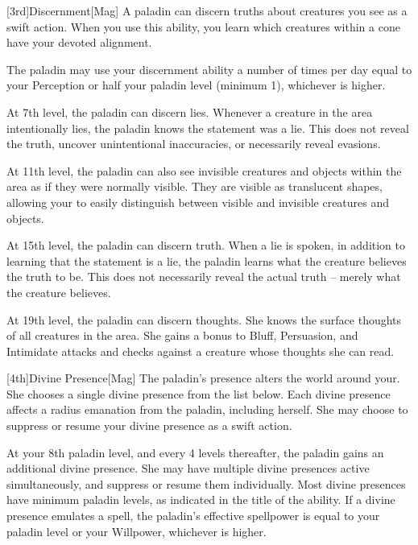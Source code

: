         [3rd]{Discernment}[Mag]
        A paladin can discern truths about creatures you see as a swift action.
        When you use this ability, you learn which creatures within a \arealarge cone have your devoted alignment.

        The paladin may use your discernment ability a number of times per day equal to your Perception or half your paladin level (minimum 1), whichever is higher.

        At 7th level, the paladin can discern lies.
        Whenever a creature in the area intentionally lies, the paladin knows the statement was a lie.
        This does not reveal the truth, uncover unintentional inaccuracies, or necessarily reveal evasions.

        At 11th level, the paladin can also see invisible creatures and objects within the area as if they were normally visible.
        They are visible as translucent shapes, allowing your to easily distinguish between visible and invisible creatures and objects.

        At 15th level, the paladin can discern truth.
        When a lie is spoken, in addition to learning that the statement is a lie, the paladin learns what the creature believes the truth to be.
        This does not necessarily reveal the actual truth -- merely what the creature believes.

        At 19th level, the paladin can discern thoughts.
        She knows the surface thoughts of all creatures in the area.
        She gains a  bonus to Bluff, Persuasion, and Intimidate attacks and checks against a creature whose thoughts she can read.

        [4th]{Divine Presence}[Mag]
        The paladin's presence alters the world around your.
        She chooses a single divine presence from the list below.
        Each divine presence affects a \areamed radius emanation from the paladin, including herself.
        She may choose to suppress or resume your divine presence as a swift action.

        At your 8th paladin level, and every 4 levels thereafter, the paladin gains an additional divine presence.
        She may have multiple divine presences active simultaneously, and suppress or resume them individually.
        Most divine presences have minimum paladin levels, as indicated in the title of the ability.
        If a divine presence emulates a spell, the paladin's effective spellpower is equal to your paladin level or your Willpower, whichever is higher.

